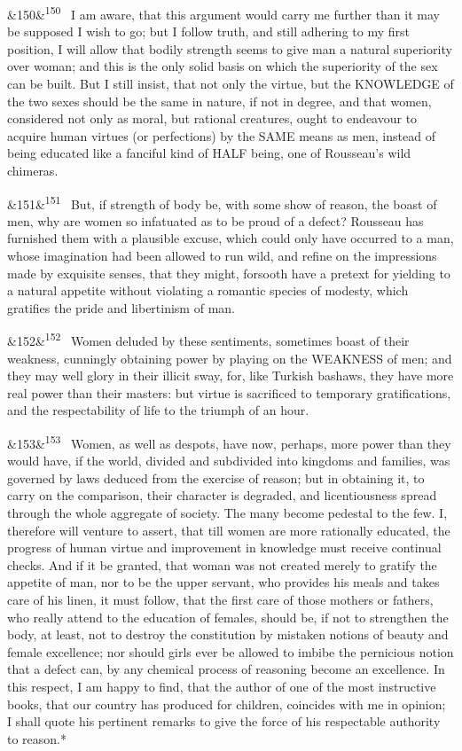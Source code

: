 \documentclass[12pt]{article}
\newcommand{\para}[1][]{\par\noindent\ifx&#1&\else\textsuperscript{\footnotesize #1}~\fi}
\begin{document}
\para[150] I am aware, that this argument would carry me further than it may be supposed I wish to go; but I follow truth, and still adhering to my first position, I will allow that bodily strength seems to give man a natural superiority over woman; and this is the only solid basis on which the superiority of the sex can be built. But I still insist, that not only the virtue, but the KNOWLEDGE of the two sexes should be the same in nature, if not in degree, and that women, considered not only as moral, but rational creatures, ought to endeavour to acquire human virtues (or perfections) by the SAME means as men, instead of being educated like a fanciful kind of HALF being, one of Rousseau's wild chimeras.

\para[151] But, if strength of body be, with some show of reason, the boast of men, why are women so infatuated as to be proud of a defect? Rousseau has furnished them with a plausible excuse, which could only have occurred to a man, whose imagination had been allowed to run wild, and refine on the impressions made by exquisite senses, that they might, forsooth have a pretext for yielding to a natural appetite without violating a romantic species of modesty, which gratifies the pride and libertinism of man.

\para[152] Women deluded by these sentiments, sometimes boast of their weakness, cunningly obtaining power by playing on the WEAKNESS of men; and they may well glory in their illicit sway, for, like Turkish bashaws, they have more real power than their masters: but virtue is sacrificed to temporary gratifications, and the respectability of life to the triumph of an hour.

\para[153] Women, as well as despots, have now, perhaps, more power than they would have, if the world, divided and subdivided into kingdoms and families, was governed by laws deduced from the exercise of reason; but in obtaining it, to carry on the comparison, their character is degraded, and licentiousness spread through the whole aggregate of society. The many become pedestal to the few. I, therefore will venture to assert, that till women are more rationally educated, the progress of human virtue and improvement in knowledge must receive continual checks. And if it be granted, that woman was not created merely to gratify the appetite of man, nor to be the upper servant, who provides his meals and takes care of his linen, it must follow, that the first care of those mothers or fathers, who really attend to the education of females, should be, if not to strengthen the body, at least, not to destroy the constitution by mistaken notions of beauty and female excellence; nor should girls ever be allowed to imbibe the pernicious notion that a defect can, by any chemical process of reasoning become an excellence. In this respect, I am happy to find, that the author of one of the most instructive books, that our country has produced for children, coincides with me in opinion; I shall quote his pertinent remarks to give the force of his respectable authority to reason.*
\end{document}
